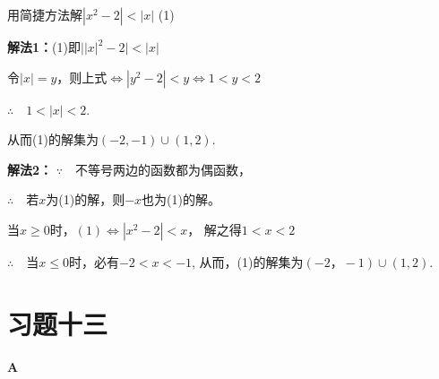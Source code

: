 \begin{example}
    用简捷方法解$|x^2-2|<|x|$ \hfill (1)
\end{example}

\begin{solution}
\textbf{解法1：}(1)即$\Big||x|^2-2\Big|<|x|$

令$|x|=y$，则上式$\Longleftrightarrow |y^2-2|<y\Longleftrightarrow 1<y<2$

$\therefore\quad 1<|x|<2$.

从而(1)的解集为$(-2,-1)\cup (1,2)$.

\textbf{解法2：} $\because\quad $不等号两边的函数都为偶函数，

$\therefore\quad $若$x$为(1)的解，则$-x$也为(1)的解。

当$x\ge 0$时，$(1)\Longleftrightarrow |x^2-2|<x$，
解之得$1<x<2$

$\therefore\quad $当$x\le 0$时，必有$-2<x<-1$, 
从而，(1)的解集为$(-2，-1)\cup (1,2)$.
\end{solution}

\section*{习题十三}
\begin{center}
    \bfseries A
\end{center}

